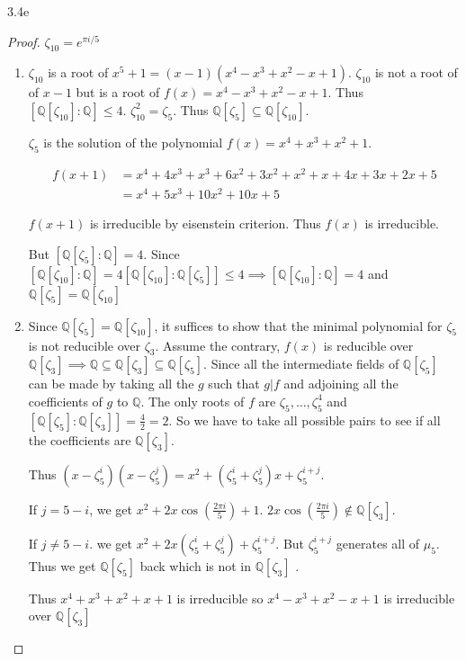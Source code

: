 \documentclass{article}
\newcommand{\Q}{\mathbb{Q}}
\begin{document}
\begin{PROB}{3.4e}\label{Problem 3.4e.}
\end{PROB}
\begin{proof}
    $\zeta_{10} = e^{\pi i / 5}$
    \begin{enumerate}
        \item $\zeta_{10}$ is a root of $x^5 + 1 = (x - 1)(x^4 - x^3 + x^2 - x + 1)$. $\zeta_{10}$ is not a root of of $x - 1$ but is a root of $f(x) = x^4 - x^3 + x^2 - x + 1$. Thus $[\Q[\zeta_{10}] : \Q] \leq 4$. $\zeta_{10}^2 = \zeta_5$. Thus $\Q[\zeta_{5}] \subseteq \Q[\zeta_{10}]$. 
        
        $\zeta_5$ is the solution of the polynomial $f(x) = x^4 + x^3 + x^2 + 1$. 
        
        \begin{align*}
            f(x + 1) &= x^4 + 4x^3 + x^3 + 6x^2 + 3x^2 + x^2 + x + 4x + 3x + 2x + 5 \\
            &= x^4 + 5x^3 + 10x^2 + 10x + 5
        \end{align*}

        $f(x + 1)$ is irreducible by eisenstein criterion. Thus $f(x)$ is irreducible.   
        
        But $[\Q[\zeta_5] : \Q] = 4$. Since $[\Q[\zeta_{10}] : \Q] = 4[\Q[\zeta_{10}] : \Q[\zeta_5]] \leq 4 \implies [\Q[\zeta_{10}] : \Q] = 4$ and $\Q[\zeta_5] = \Q[\zeta_{10}]$      
        \item Since $\Q[\zeta_5] = \Q[\zeta_{10}]$, it suffices to show that the minimal polynomial for $\zeta_{5}$ is not reducible over $\zeta_3$. Assume the contrary, $f(x)$ is reducible over $\Q[\zeta_3] \implies \Q \subseteq \Q[\zeta_3] \subseteq \Q[\zeta_5]$. Since all the intermediate fields of $\Q[\zeta_5]$ can be made by taking all the $g$ such that $g | f$ and adjoining all the coefficients of $g$ to $\Q$. The only roots of $f$ are $\zeta_5, \dots, \zeta_5^4$ and $[\Q[\zeta_5] : \Q[\zeta_3]] = \frac{4}{2} = 2$. So we have to take all possible pairs to see if all the coefficients are $\Q[\zeta_3]$. 
        
        Thus $(x - \zeta_5^i)(x - \zeta_5^j) = x^2 + (\zeta_5^i + \zeta_5^j)x + \zeta_5^{i + j}$. 
        
        If $j = 5 - i$, we get $x^2 + 2x\cos(\frac{2 \pi i}{5}) + 1$. $2x\cos(\frac{2 \pi i}{5})  \not \in \Q[\zeta_3]$. 
        
        If $j \neq 5 - i$. we get $x^2 + 2x(\zeta_5^i + \zeta_5^j) + \zeta_5^{i + j}$. But $\zeta_5^{i + j}$ generates all of $\mu_5$. Thus we get $\Q[\zeta_5]$ back which is not in $\Q[\zeta_3]$ . 
        
        
        Thus $x^4 + x^3 + x^2 + x + 1$ is irreducible so $x^4 - x^3 + x^2 - x + 1$ is irreducible over $\Q[\zeta_3]$   
    \end{enumerate}
\end{proof}
\end{document}
